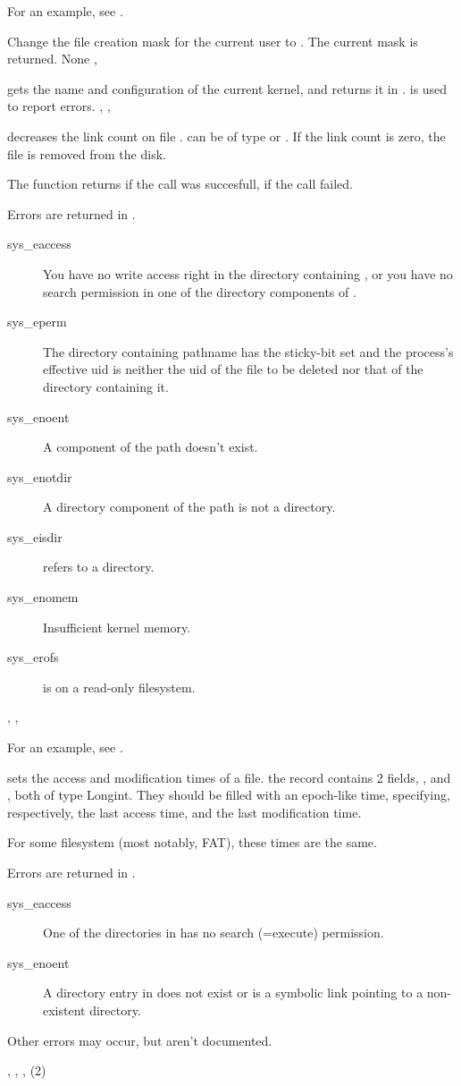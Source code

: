 For an example, see .

{
Change the file creation mask for the current user to . The
current mask is returned.
}
{None}
{, }



{ gets the name and configuration of the current \linux kernel,
and returns it in .
}
{ is used to report errors.}
{, , }

{
 decreases the link count on file .  can be
of type  or . If the link count is zero, the
file is removed from the disk.

The function returns  if the call was succesfull,  if the call
failed.
}
{ Errors are returned in .
\begin{description}
\item[sys\_eaccess] You have no write access right in the directory
containing , or you have no search permission in one of the
directory components of .
\item[sys\_eperm] The  directory containing pathname has the sticky-bit 
set and the process's effective  uid is neither the uid of the 
file to be deleted nor that of the directory containing it.
\item[sys\_enoent] A component of the path doesn't exist.
\item[sys\_enotdir] A directory component of the path is not a directory.
\item[sys\_eisdir]  refers to a directory.
\item[sys\_enomem] Insufficient kernel memory.
\item[sys\_erofs]  is on a read-only filesystem. 
\end{description}
}
{, ,  }

For an example, see .


{
 sets the access and modification times of a file.
the  record contains 2 fields, , and ,
both of type Longint. They should be filled with an epoch-like time,
specifying, respectively, the last access time, and the last modification
time. 

For some filesystem (most notably, FAT), these times are the same. 
}
{Errors are returned in .
\begin{description}
\item[sys\_eaccess] One of the directories in  has no
search (=execute) permission.
\item[sys\_enoent] A directory entry in  does
not exist or is a symbolic link pointing to a non-existent directory.
\end{description}
Other errors may occur, but aren't documented.
}
{, , , (2)}

